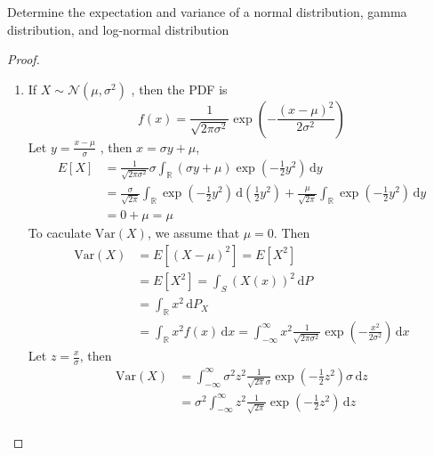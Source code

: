 \documentclass[../main.tex]{subfiles}
\begin{document}
\begin{exercise}{}{}
    Determine the expectation and variance of a normal distribution, gamma distribution, and log-normal
 distribution
\end{exercise}
\begin{proof}
    \begin{enumerate}
        \item If \(  X \sim  \mathcal{N}\left( \mu , \sigma ^{2} \right)  \) , then the PDF is  \[
        f\left( x \right)= \frac{1 }{\sqrt{2 \pi \sigma ^{2}} }\exp \left( - \frac{\left( x-\mu  \right)^{2}  }{ 2 \sigma ^{2}}  \right)   
        \] Let \(  y= \frac{x-\mu  }{ \sigma  }   \) , then \(  x =  \sigma y+ \mu   \), \[
        \begin{aligned}
        E\left[ X \right]&= \frac{1 }{\sqrt{2 \pi \sigma ^{2}} }  \sigma  \int_{\mathbb{R} }\left(  \sigma y+ \mu  \right)\exp \left( -\frac{1}{2}y^{2} \right) \,\mathrm{d} y     \\ 
         &=  \frac{ \sigma  }{ \sqrt{2 \pi} }\int_{\mathbb{R} }\exp \left( -\frac{1}{2}y^{2} \right)\,\mathrm{d} \left( \frac{1}{2}y^{2} \right)+  \frac{\mu  }{ \sqrt{2 \pi} } \int_{\mathbb{R} }   \exp \left( -\frac{1 }{2 }y^{2}  \right)\,\mathrm{d} y  \\ 
          &= 0+  \mu = \mu  
        \end{aligned}
        \] To caculate \(  \mathrm{Var}\left( X \right)   \), we assume that   \(  \mu = 0  \). Then \[
        \begin{aligned}
        \mathrm{Var}\left( X \right)&= E\left[ \left( X-\mu  \right)^{2}  \right] = E\left[ X^{2} \right]   \\ 
         &= E\left[ X^{2} \right] =  \int_{S} \left( X\left( x \right)  \right)^{2} \,\mathrm{d} P\\ 
          &=  \int_{\mathbb{R} }x^{2} \,\mathrm{d} P_{X}\\ 
           &=  \int_{\mathbb{R} } x^{2}f\left( x \right)\,\mathrm{d} x =  \int_{-\infty}^{\infty}x^{2}\frac{1 }{\sqrt{2 \pi \sigma ^{2}} }\exp \left( -\frac{x^{2} }{2 \sigma ^{2} }  \right)\,\mathrm{d} x    
        \end{aligned}
        \] Let \(  z = \frac{x }{ \sigma  }   \), then \[
        \begin{aligned}
        \mathrm{Var}\left( X \right)&=  \int_{-\infty}^{\infty} \sigma ^{2}z^{2} \frac{1 }{\sqrt{2 \pi} \sigma  }\exp \left( -\frac{1}{2}z^{2} \right) \sigma \,\mathrm{d} z\\ 
         &= \sigma ^{2} \int_{-\infty}^{\infty}z^{2}\frac{1 }{\sqrt{2 \pi} } \exp \left( -\frac{1 }{2 }z^{2}  \right)\,\mathrm{d} z\\ 

\end{aligned}\]
\end{enumerate}
\end{proof}
\end{document}
